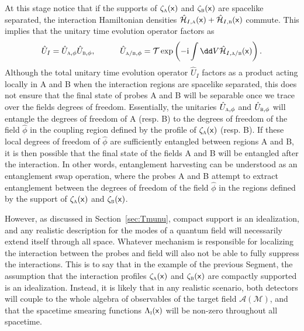 \documentclass[letterpaper,12pt,titlepage,oneside,final]{book}
\newcommand{\M}{\mathcal{M}}
\newcommand{\mf}{\mathsf}%
\newcommand{\ii}{\mathrm{i}}
\newcommand{\tc}[1]{\textsc{#1}}
\begin{document}
    At this stage notice that if the supports of $\zeta_\tc{a}(\mf x)$ and $\zeta_\tc{b}(\mf x)$ are spacelike separated, the interaction Hamiltonian densities $\hat{\mathcal{H}}_{I,\tc{a}}(\mf x) + \hat{\mathcal{H}}_{I,\tc{b}}(\mf x)$ commute. This implies that the unitary time evolution operator factors as
    \begin{equation}
        \hat{U}_I = \hat{U}_{\tc{a},\phi}\hat{U}_{\tc{b},\phi}, \quad\quad\quad \hat{U}_{\tc{a}/\tc{b},\phi} = \mathcal{T}\exp\left(-\ii \int \dd V \hat{\mathcal{H}}_{I,\tc{a}/\tc{b}}(\mf x)\right).
    \end{equation}
    Although the total unitary time evolution operator $\hat{U}_I$ factors as a product acting locally in A and B when the interaction regions are spacelike separated, this does not ensure that the final state of probes A and B will be separable once we trace over the fields degrees of freedom. Essentially, the unitaries $\hat{U}_{\tc{a},\phi}$ and $\hat{U}_{\tc{b},\phi}$ will entangle the degrees of freedom of A (resp. B) to the degrees of freedom of the field $\hat{\phi}$ in the coupling region defined by the profile of $\zeta_\tc{a}(\mf x)$ (resp. B). If these local degrees of freedom of $\hat{\phi}$ are sufficiently entangled between regions A and B, it is then possible that the final state of the fields A and B will be entangled after the interaction. In other words, entanglement harvesting can be understood as an entanglement swap operation, where the probes A and B attempt to extract entanglement between the degrees of freedom of the field $\hat{\phi}$ in the regions defined by the support of $\zeta_\tc{a}(\mf x)$ and $\zeta_{\tc{b}}(\mf x)$.

    However, as discussed in Section~\ref{sec:Tmunu}, compact support is an idealization, and any realistic description for the modes of a quantum field will necessarily extend itself through all space. Whatever mechanism is responsible for localizing the interaction between the probes and field will also not be able to fully suppress the interactions. This is to say that in the example of the previous Segment, the assumption that the interaction profiles $\zeta_\tc{a}(\mf x)$ and $\zeta_\tc{b}(\mf x)$ are compactly supported is an idealization. Instead, it is likely that in any realistic scenario, both detectors will couple to the whole algebra of observables of the target field $\mathcal{A}(\M)$, and that the spacetime smearing functions $\Lambda_\tc{i}(\mf x)$ will be non-zero throughout all spacetime. 
    
\end{document}
